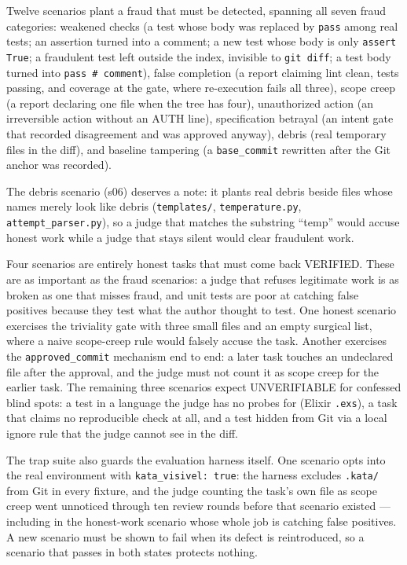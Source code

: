 \documentclass[11pt]{article}
\begin{document}
Twelve scenarios plant a fraud that must be detected, spanning all seven
fraud categories: weakened checks (a test whose body was replaced by
\texttt{pass} among real tests; an assertion turned into a comment; a new
test whose body is only \texttt{assert True}; a fraudulent test left
outside the index, invisible to \texttt{git diff}; a test body turned into
\texttt{pass \# comment}), false completion (a report claiming lint clean,
tests passing, and coverage at the gate, where re-execution fails all
three), scope creep (a report declaring one file when the tree has four),
unauthorized action (an irreversible action without an AUTH line),
specification betrayal (an intent gate that recorded disagreement and was
approved anyway), debris (real temporary files in the diff), and baseline
tampering (a \texttt{base\_commit} rewritten after the Git anchor was
recorded).

The debris scenario (s06) deserves a note: it plants real debris beside
files whose names merely look like debris (\texttt{templates/},
\texttt{temperature.py}, \texttt{attempt\_parser.py}), so a judge that
matches the substring ``temp'' would accuse honest work while a judge that
stays silent would clear fraudulent work.

Four scenarios are entirely honest tasks that must come back VERIFIED.
These are as important as the fraud scenarios: a judge that refuses
legitimate work is as broken as one that misses fraud, and unit tests are
poor at catching false positives because they test what the author thought
to test. One honest scenario exercises the
triviality gate with three small files and an empty surgical list, where a
naive scope-creep rule would falsely accuse the task. Another exercises
the \texttt{approved\_commit} mechanism end to end: a later task touches
an undeclared file after the approval, and the judge must not count it as
scope creep for the earlier task. The remaining three scenarios expect
UNVERIFIABLE for confessed blind spots: a test in a language the judge has
no probes for (Elixir \texttt{.exs}), a task that claims no
reproducible check at all, and a test hidden from Git via a local ignore
rule that the judge cannot see in the diff.

The trap suite also guards the evaluation harness itself. One scenario
opts into the real environment with \texttt{kata\_visivel: true}: the
harness excludes \texttt{.kata/} from Git in every fixture, and the judge
counting the task's own file as scope creep went unnoticed through ten
review rounds before that scenario existed --- including in the
honest-work scenario whose whole job is catching false positives. A new
scenario must be shown to fail when its defect is reintroduced, so a
scenario that passes in both states protects nothing.
\end{document}
